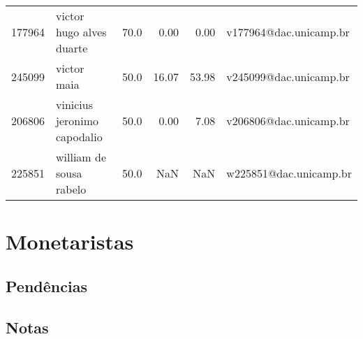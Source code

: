 \documentclass[11pt]{article}
\begin{document}
{\begin{landscape}
\begin{longtable}{llrrrl}
177964 &               victor hugo alves duarte &                  70.0 &        0.00 &        0.00 &  v177964@dac.unicamp.br \\
245099 &                            victor maia &                  50.0 &       16.07 &       53.98 &  v245099@dac.unicamp.br \\
206806 &            vinicius jeronimo capodalio &                  50.0 &        0.00 &        7.08 &  v206806@dac.unicamp.br \\
225851 &                william de sousa rabelo &                  50.0 &         NaN &         NaN &  w225851@dac.unicamp.br \\
\end{longtable}
\end{landscape}}



\section{Monetaristas}
\label{sec:org62901d9}

\subsection{Pendências}
\label{sec:org7b1773e}

\subsection{Notas}
\label{sec:org1b4829c}
\end{document}
